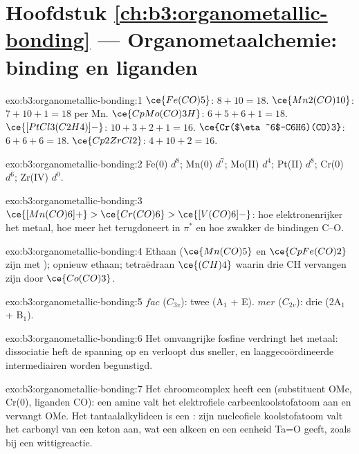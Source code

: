 \section*{Hoofdstuk \ref{ch:b3:organometallic-bonding} --- Organometaalchemie: binding en liganden}

\begin{solution}{exo:b3:organometallic-bonding:1}
$\ce{Fe(CO)5}$: $8 + 10 = 18$. $\ce{Mn2(CO)10}$: $7 + 10 + 1 = 18$ per Mn. $\ce{CpMo(CO)3H}$: $6 + 5 + 6 + 1 =
18$. $\ce{[PtCl3(C2H4)]-}$: $10 + 3 + 2 + 1 = 16$. $\ce{Cr($\eta^6$-C6H6)(CO)3}$: $6 + 6 + 6 = 18$. $\ce{Cp2ZrCl2}$:
$4 + 10 + 2 = 16$.
\end{solution}

\begin{solution}{exo:b3:organometallic-bonding:2}
Fe(0) $d^8$; Mn(0) $d^7$; Mo(II) $d^4$; Pt(II) $d^8$; Cr(0) $d^6$; Zr(IV) $d^0$.
\end{solution}

\begin{solution}{exo:b3:organometallic-bonding:3}
$\ce{[Mn(CO)6]+} > \ce{Cr(CO)6} > \ce{[V(CO)6]-}$: hoe elektronenrijker het metaal, hoe meer het
terugdoneert in $\pi^*$ en hoe zwakker de bindingen C--O.
\end{solution}

\begin{solution}{exo:b3:organometallic-bonding:4}
Ethaan ($\ce{Mn(CO)5}$ en $\ce{CpFe(CO)2}$ zijn  met ); opnieuw ethaan; tetraëdraan
$\ce{(CH)4}$ waarin drie CH vervangen zijn door $\ce{Co(CO)3}$.
\end{solution}

\begin{solution}{exo:b3:organometallic-bonding:5}
$fac$ ($C_{3v}$): twee (A$_1$ + E). $mer$ ($C_{2v}$): drie (2A$_1$ + B$_1$).
\end{solution}

\begin{solution}{exo:b3:organometallic-bonding:6}
Het omvangrijke fosfine verdringt het metaal: dissociatie heft de
spanning op en verloopt dus sneller, en laaggecoördineerde intermediairen
worden begunstigd.
\end{solution}

\begin{solution}{exo:b3:organometallic-bonding:7}
Het chroomcomplex heeft een  (substituent OMe, Cr(0), liganden CO): een
amine valt het elektrofiele carbeenkoolstofatoom aan en vervangt OMe. Het
tantaalalkylideen is een : zijn nucleofiele koolstofatoom
valt het carbonyl van een
keton aan, wat een alkeen en een eenheid Ta=O geeft, zoals bij een wittigreactie.
\end{solution}

